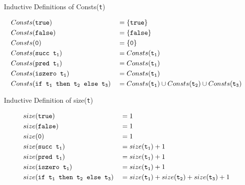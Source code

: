 \begin{frame}{Inductive Definitions of Consts(\texttt{t})}
\begin{definition}[3.3.1]
\begin{alignat*}{2}
  &Consts(\texttt{true}) &&= \{\texttt{true}\}\\
  &Consts(\texttt{false}) &&= \{\texttt{false}\}\\
  &Consts(\texttt{0}) &&= \{\texttt{0}\}\\
  &Consts(\texttt{succ t\textsubscript{1}}) &&= Consts(\texttt{t\textsubscript{1}})\\
  &Consts(\texttt{pred t\textsubscript{1}}) &&= Consts(\texttt{t\textsubscript{1}})\\
  &Consts(\texttt{iszero t\textsubscript{1}}) &&= Consts(\texttt{t\textsubscript{1}})\\
  &Consts(\texttt{if t\textsubscript{1} then t\textsubscript{2} else t\textsubscript{3}}) &&= Consts(\texttt{t\textsubscript{1}}) \cup Consts(\texttt{t\textsubscript{2}}) \cup Consts(\texttt{t\textsubscript{3}})
\end{alignat*}
\end{definition}
\end{frame}

\begin{frame}{Inductive Definition of size(\texttt{t})}
\begin{definition}
\begin{alignat*}{2}
  &size(\texttt{true}) &&= 1\\
  &size(\texttt{false}) &&= 1\\
  &size(\texttt{0}) &&= 1\\
  &size(\texttt{succ t\textsubscript{1}}) &&= size(\texttt{t\textsubscript{1}}) + 1\\
  &size(\texttt{pred t\textsubscript{1}}) &&= size(\texttt{t\textsubscript{1}}) + 1\\
  &size(\texttt{iszero t\textsubscript{1}}) &&= size(\texttt{t\textsubscript{1}}) + 1\\
  &size(\texttt{if t\textsubscript{1} then t\textsubscript{2} else t\textsubscript{3}}) &&= size(\texttt{t\textsubscript{1}}) + size(\texttt{t\textsubscript{2}}) + size(\texttt{t\textsubscript{3}}) + 1
\end{alignat*}
\end{definition}
\end{frame}

